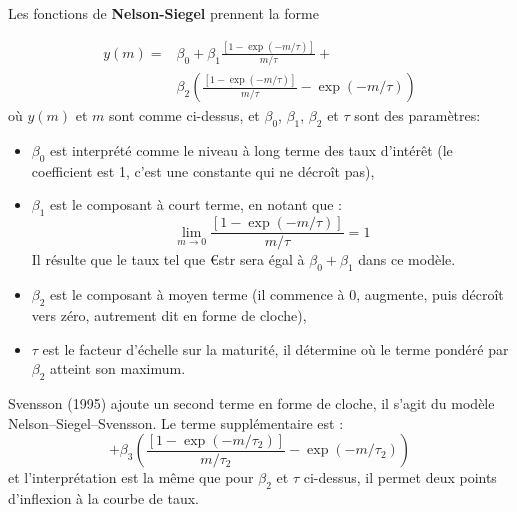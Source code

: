 \begin{f}


Les fonctions de \textbf{Nelson-Siegel}  prennent la forme

{\small\begin{align*}
y( m ) =& \beta _0 + \beta _1\frac{{\left[ {1 - \exp \left( { - m/\tau} \right)} \right]}}{m/\tau} + \\
		&\beta _2 {\left(\frac{{\left[ {1 - \exp \left( { - m/\tau} \right)} \right]}}{m/\tau} - \exp \left( { - m/\tau}\right)\right)}
\label{MTNSeq}
\end{align*}}
%
où $y\left( m \right)$ et $m$ sont comme ci-dessus, et $\beta _0$, $\beta_1$, $\beta_2$ et $\tau$ sont des paramètres:


\begin{itemize}

\item   $\beta_0$ est interprété comme le niveau à long terme des taux d'intérêt (le coefficient est 1, c'est une constante qui ne décroît pas),

\item   $\beta_1$ est le composant à court terme, en notant que :
\begin{equation*}
	\lim_{m \rightarrow 0} \frac{{\left[ {1 - \exp \left( { - m/\tau} \right)} \right]}}{m/\tau}=1
\end{equation*}
Il résulte que le taux  tel que €str sera égal à  $\beta_0+\beta_1$ dans ce modèle.
\item   $\beta_2$ est le composant à moyen terme (il commence à 0, augmente, puis décroît vers zéro, autrement dit en forme de cloche),
\item   $\tau$ est le facteur d'échelle sur la maturité, il détermine où le terme pondéré par $\beta_2$ atteint son maximum. 
\end{itemize}

Svensson (1995) ajoute un second terme en forme de cloche, il s'agit du modèle Nelson–Siegel–Svensson. Le terme supplémentaire est :
%
\begin{equation*}
+\beta _3 {\left(\frac{{\left[ {1 - \exp \left( { - m/\tau_2} \right)} \right]}}{m/\tau_2} - \exp \left( { - m/\tau_2}\right)\right)}
\label{MTSveq}
\end{equation*}
et l'interprétation est la même que pour $\beta_2$ et $\tau$ ci-dessus, il permet deux points d'inflexion à la courbe de taux.


\end{f}
